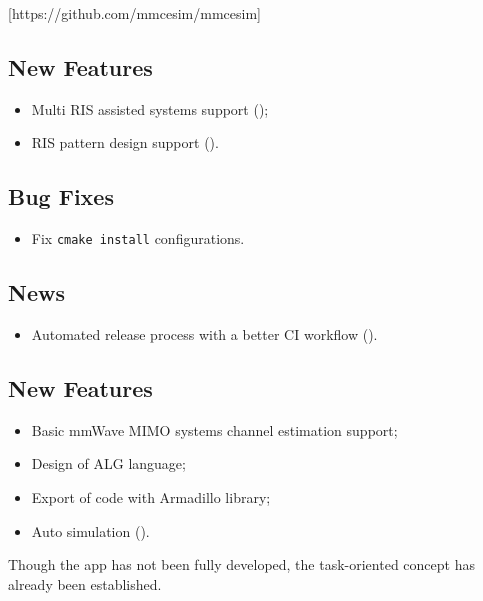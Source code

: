 [https://github.com/mmcesim/mmcesim]

\subsection*{New Features}
\begin{itemize}
  \item Multi RIS assisted systems support ();
  \item RIS pattern design support ().
\end{itemize}
\subsection*{Bug Fixes}
\begin{itemize}
  \item Fix \texttt{cmake install} configurations.
\end{itemize}
\subsection*{News}
\begin{itemize}
  \item Automated release process with a better CI workflow ().
\end{itemize}

\subsection*{New Features}
\begin{itemize}
  \item Basic mmWave MIMO systems channel estimation support;
  \item Design of ALG language;
  \item Export of code with Armadillo library;
  \item Auto simulation ().
\end{itemize}

Though the app has not been fully developed,
the task-oriented concept has already been established.
